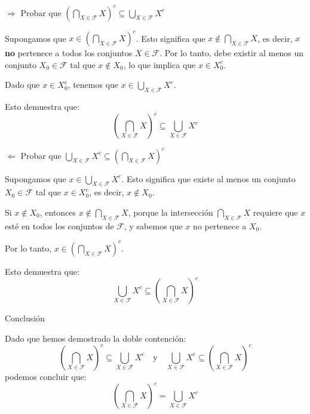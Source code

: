 \begin{solution}
    
    $\Rightarrow$ Probar que \( \left( \bigcap_{X \in \mathscr{F}} X \right)^c \subseteq \bigcup_{X \in \mathscr{F}} X^c \)
    
    Supongamos que \( x \in \left( \bigcap_{X \in \mathscr{F}} X \right)^c \). Esto significa que \( x \notin \bigcap_{X \in \mathscr{F}} X \), es decir, \( x \) \textbf{no} pertenece a todos los conjuntos \( X \in \mathscr{F} \). Por lo tanto, debe existir al menos un conjunto \( X_0 \in \mathscr{F} \) tal que \( x \notin X_0 \), lo que implica que \( x \in X_0^c \).
    
    Dado que \( x \in X_0^c \), tenemos que \( x \in \bigcup_{X \in \mathscr{F}} X^c \).
    
    Esto demuestra que:
    \[
    \left( \bigcap_{X \in \mathscr{F}} X \right)^c \subseteq \bigcup_{X \in \mathscr{F}} X^c
    \]
    
    $\Leftarrow$ Probar que \( \bigcup_{X \in \mathscr{F}} X^c \subseteq \left( \bigcap_{X \in \mathscr{F}} X \right)^c \)
    
    Supongamos que \( x \in \bigcup_{X \in \mathscr{F}} X^c \). Esto significa que existe al menos un conjunto \( X_0 \in \mathscr{F} \) tal que \( x \in X_0^c \), es decir, \( x \notin X_0 \).
    
    Si \( x \notin X_0 \), entonces \( x \notin \bigcap_{X \in \mathscr{F}} X \), porque la intersección \( \bigcap_{X \in \mathscr{F}} X \) requiere que \( x \) esté en todos los conjuntos de \( \mathscr{F} \), y sabemos que \( x \) no pertenece a \( X_0 \).
    
    Por lo tanto, \( x \in \left( \bigcap_{X \in \mathscr{F}} X \right)^c \).
    
    Esto demuestra que:
    \[
    \bigcup_{X \in \mathscr{F}} X^c \subseteq \left( \bigcap_{X \in \mathscr{F}} X \right)^c
    \]
    
    Conclusión
    
    Dado que hemos demostrado la doble contención:
    \[
    \left( \bigcap_{X \in \mathscr{F}} X \right)^c \subseteq \bigcup_{X \in \mathscr{F}} X^c \quad \text{y} \quad \bigcup_{X \in \mathscr{F}} X^c \subseteq \left( \bigcap_{X \in \mathscr{F}} X \right)^c
    \]
    podemos concluir que:
    \[
    \left( \bigcap_{X \in \mathscr{F}} X \right)^c = \bigcup_{X \in \mathscr{F}} X^c
    \] 
    
\end{solution}